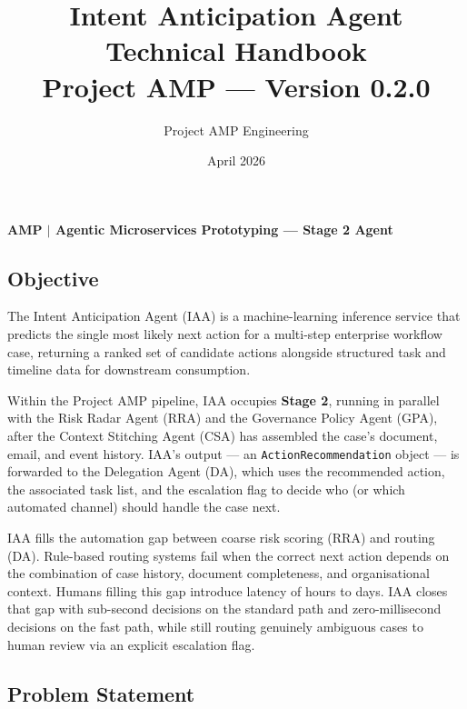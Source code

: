 \documentclass[12pt,a4paper]{article}
\title{
  {\color{ampblue}\Huge\bfseries Intent Anticipation Agent}\\[6pt]
  {\color{ampgray}\Large Technical Handbook}\\[10pt]
  {\normalsize Project AMP --- Version 0.2.0}
}
\author{Project AMP Engineering}
\date{April 2026}
\begin{document}
\maketitle
\thispagestyle{empty}

\vspace{2em}
\begin{center}
\colorbox{ampblue}{\parbox{0.8\textwidth}{\centering\color{white}\bfseries\large
  AMP $|$ Agentic Microservices Prototyping --- Stage 2 Agent}}
\end{center}

\vspace{2em}
\tableofcontents
\clearpage

\subsection{Objective}

The Intent Anticipation Agent (IAA) is a machine-learning inference service that predicts
the single most likely next action for a multi-step enterprise workflow case, returning
a ranked set of candidate actions alongside structured task and timeline data for
downstream consumption.

Within the Project AMP pipeline, IAA occupies \textbf{Stage 2}, running in parallel with
the Risk Radar Agent (RRA) and the Governance Policy Agent (GPA), after the Context
Stitching Agent (CSA) has assembled the case's document, email, and event history.
IAA's output --- an \texttt{ActionRecommendation} object --- is forwarded to the
Delegation Agent (DA), which uses the recommended action, the associated task list, and
the escalation flag to decide who (or which automated channel) should handle the case next.

IAA fills the automation gap between coarse risk scoring (RRA) and routing (DA).
Rule-based routing systems fail when the correct next action depends on the
combination of case history, document completeness, and organisational context.
Humans filling this gap introduce latency of hours to days. IAA closes that gap with
sub-second decisions on the standard path and zero-millisecond decisions on the fast path,
while still routing genuinely ambiguous cases to human review via an explicit escalation flag.

\subsection{Problem Statement}
\end{document}
